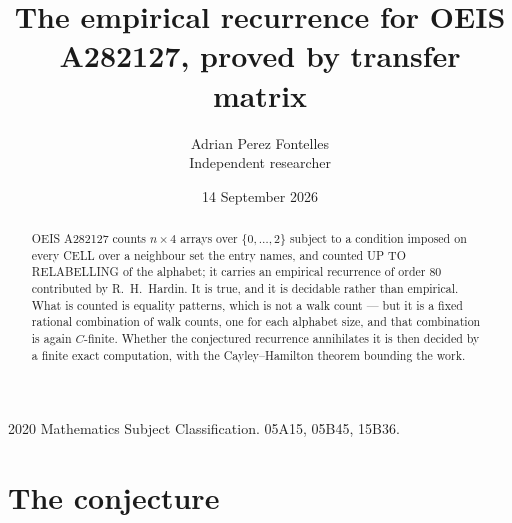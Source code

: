 \documentclass[11pt,a4paper]{article}
\title{The empirical recurrence for OEIS A282127, proved by transfer matrix}
\author{Adrian Perez Fontelles\\ \small Independent researcher}
\date{14 September 2026}
\theoremstyle{plain}
\theoremstyle{definition}
\begin{document}
\maketitle

\begin{abstract}
OEIS A282127 counts $n\times4$ arrays over $\{0,\dots,2\}$ subject to a condition imposed on
every CELL over a neighbour set the entry names, and counted UP TO RELABELLING of the
alphabet; it carries an empirical recurrence of order $80$ contributed by
R.~H.~Hardin. It is true, and it is decidable rather than empirical. What is counted is
equality patterns, which is not a walk count --- but it is a fixed rational combination of
walk counts, one for each alphabet size, and that combination is again $C$-finite. Whether the
conjectured recurrence annihilates it is then decided by a finite exact computation, with the
Cayley--Hamilton theorem bounding the work.
\end{abstract}

\noindent\small 2020 Mathematics Subject Classification. 05A15, 05B45, 15B36.\normalsize

\section{The conjecture}
\end{document}
